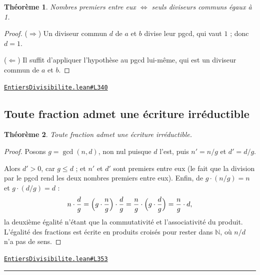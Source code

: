 \documentclass[11pt,a4paper]{article}
\theoremstyle{definition}
\theoremstyle{plain}
\newtheorem{theoreme}{Théorème}
\newcommand{\source}[2]{\par\smallskip\noindent\hfill{\footnotesize\href{#1}{\texttt{#2}}}\par\smallskip}
\begin{document}
\begin{theoreme}
Nombres premiers entre eux \(\iff\) seuls diviseurs communs égaux à 1.
\end{theoreme}

\begin{proof}
($\Rightarrow$) Un diviseur commun $d$ de $a$ et $b$ divise leur pgcd, qui vaut $1$ ;
donc $d = 1$.

($\Leftarrow$) Il suffit d'appliquer l'hypothèse au pgcd lui-même, qui est un diviseur
commun de $a$ et $b$.
\end{proof}
\source{https://github.com/Commutator-IO/learn-lean/blob/main/courses/01-college/01-nombres-et-calculs/EntiersDivisibilite.lean\#L340}{EntiersDivisibilite.lean\#L340}

\subsection{Toute fraction admet une écriture irréductible}

\begin{theoreme}
Toute fraction admet une écriture irréductible.
\end{theoreme}

\begin{proof}
Posons $g = \gcd(n,d)$, non nul puisque $d$ l'est, puis $n' = n/g$ et $d' = d/g$.

Alors $d' > 0$, car $g \le d$ ; et $n'$ et $d'$ sont premiers entre eux
(le fait que la division par le pgcd rend les deux nombres premiers entre eux). Enfin, de $g \cdot (n/g) = n$ et
$g \cdot (d/g) = d$ :
\[
n \cdot \frac{d}{g}
 = \Bigl(g \cdot \frac{n}{g}\Bigr) \cdot \frac{d}{g}
 = \frac{n}{g} \cdot \Bigl(g \cdot \frac{d}{g}\Bigr)
 = \frac{n}{g} \cdot d ,
\]
la deuxième égalité n'étant que la commutativité et l'associativité du produit. L'égalité
des fractions est écrite en produits croisés pour rester dans $\mathbb{N}$, où $n/d$ n'a
pas de sens.
\end{proof}
\source{https://github.com/Commutator-IO/learn-lean/blob/main/courses/01-college/01-nombres-et-calculs/EntiersDivisibilite.lean\#L353}{EntiersDivisibilite.lean\#L353}

\vfill
\noindent\rule{0.35\linewidth}{0.4pt}\par
{}
\end{document}
